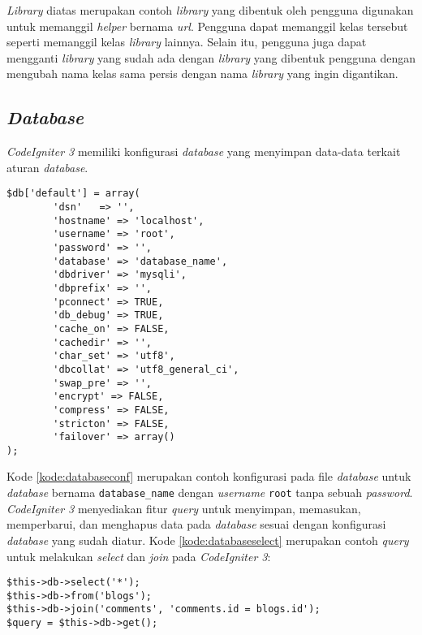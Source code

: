 \textit{Library} diatas merupakan contoh \textit{library} yang dibentuk oleh pengguna digunakan untuk memanggil \textit{helper} bernama \textit{url}. Pengguna dapat memanggil kelas tersebut seperti memanggil kelas \textit{library} lainnya. Selain itu, pengguna juga dapat mengganti \textit{library} yang sudah ada dengan \textit{library} yang dibentuk pengguna dengan mengubah nama kelas sama persis dengan nama \textit{library} yang ingin digantikan.

\subsection{\textit{Database}}
\textit{CodeIgniter 3} memiliki konfigurasi \textit{database} yang menyimpan data-data terkait aturan \textit{database}.

\begin{lstlisting}[caption=Contoh konfigurasi \textit{database}, label=kode:databaseconf]
$db['default'] = array(
        'dsn'   => '',
        'hostname' => 'localhost',
        'username' => 'root',
        'password' => '',
        'database' => 'database_name',
        'dbdriver' => 'mysqli',
        'dbprefix' => '',
        'pconnect' => TRUE,
        'db_debug' => TRUE,
        'cache_on' => FALSE,
        'cachedir' => '',
        'char_set' => 'utf8',
        'dbcollat' => 'utf8_general_ci',
        'swap_pre' => '',
        'encrypt' => FALSE,
        'compress' => FALSE,
        'stricton' => FALSE,
        'failover' => array()
);
\end{lstlisting}

Kode \ref{kode:databaseconf} merupakan contoh konfigurasi pada file \textit{database} untuk \textit{database} bernama \texttt{database\_name} dengan \textit{username} \texttt{root} tanpa sebuah \textit{password}. \textit{CodeIgniter 3} menyediakan fitur \textit{query} untuk menyimpan, memasukan, memperbarui, dan menghapus data pada \textit{database} sesuai dengan konfigurasi \textit{database} yang sudah diatur. Kode \ref{kode:databaseselect} merupakan contoh \textit{query} untuk melakukan \textit{select} dan \textit{join} pada \textit{CodeIgniter 3}:

\begin{lstlisting}[caption=Contoh penggunaan \textit{query}, label=kode:databaseselect]
$this->db->select('*');
$this->db->from('blogs');
$this->db->join('comments', 'comments.id = blogs.id');
$query = $this->db->get();
\end{lstlisting}

